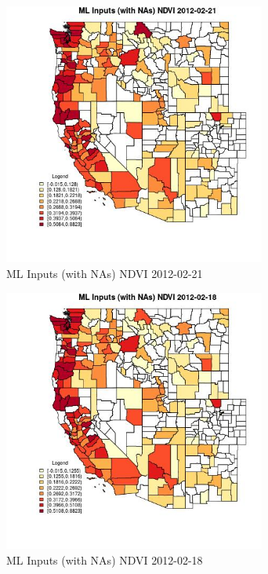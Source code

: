 \begin{figure} 
\centering  
\includegraphics[width=0.77\textwidth]{Code_Outputs/Report_ML_input_PM25_Step4_part_f_de_duplicated_aves_prioritize_24hr_obswNAs_CountyNDVIMean2012-02-21.jpg} 
\caption{\label{fig:Report_ML_input_PM25_Step4_part_f_de_duplicated_aves_prioritize_24hr_obswNAsCountyNDVIMean2012-02-21}ML Inputs (with NAs) NDVI 2012-02-21} 
\end{figure} 
 

\clearpage 

\begin{figure} 
\centering  
\includegraphics[width=0.77\textwidth]{Code_Outputs/Report_ML_input_PM25_Step4_part_f_de_duplicated_aves_prioritize_24hr_obswNAs_CountyNDVIMean2012-02-18.jpg} 
\caption{\label{fig:Report_ML_input_PM25_Step4_part_f_de_duplicated_aves_prioritize_24hr_obswNAsCountyNDVIMean2012-02-18}ML Inputs (with NAs) NDVI 2012-02-18} 
\end{figure} 
 

